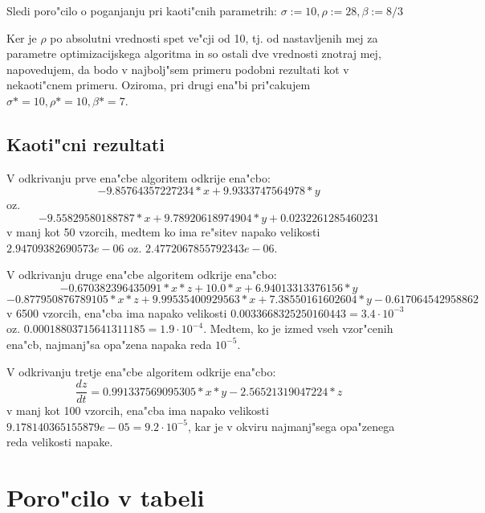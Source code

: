 \documentclass[10pt,a4paper]{article}
\begin{document}
Sledi poro"cilo o poganjanju pri kaoti"cnih parametrih:
$\sigma:=10, \rho:=28, \beta:=8/3$

Ker je $\rho$ po absolutni vrednosti spet ve"cji od 10, tj. od nastavljenih 
mej za parametre optimizacijskega algoritma in so ostali dve vrednosti 
znotraj mej, napovedujem, da bodo v najbolj"sem primeru podobni rezultati kot 
v nekaoti"cnem primeru. Oziroma, pri drugi ena"bi pri"cakujem 
$\sigma* = 10, \rho*= 10, \beta*=7$. 


\subsection{Kaoti"cni rezultati}

V odkrivanju prve ena"cbe algoritem odkrije ena"cbo: 
$$-9.85764357227234*x + 9.9333747564978*y$$  
oz. $$-9.55829580188787*x + 9.78920618974904*y + 0.0232261285460231$$
v manj kot 50 vzorcih, medtem ko ima re"sitev napako velikosti
$2.94709382690573e-06$ oz. $2.4772067855792343e-06$.

V odkrivanju druge ena"cbe algoritem odkrije ena"cbo:
$$ -0.670382396435091*x*z + 10.0*x + 6.94013313376156*y $$
$$ -0.877950876789105*x*z + 9.99535400929563*x + 7.38550161602604*y - 0.617064542958862 $$ 
v 6500 vzorcih, ena"cba ima napako velikosti
$0.0033668325250160443 = 3.4\cdot 10^ {-3}$ oz. $0.00018803715641311185 = 1.9\cdot 10^ {-4}$.
Medtem, ko je izmed vseh vzor"cenih ena"cb, najmanj"sa opa"zena napaka
reda $10^ {-5}$.

V odkrivanju tretje ena"cbe algoritem odkrije ena"cbo: 
$$\frac{dz}{dt} = 0.991337569095305*x*y - 2.56521319047224*z$$ 
v manj kot 100 vzorcih, ena"cba ima napako velikosti
$9.178140365155879e-05 = 9.2\cdot 10^ {-5}$,
kar je v okviru najmanj"sega opa"zenega reda velikosti napake.

\pagebreak
\section{Poro"cilo v tabeli}
\end{document}
